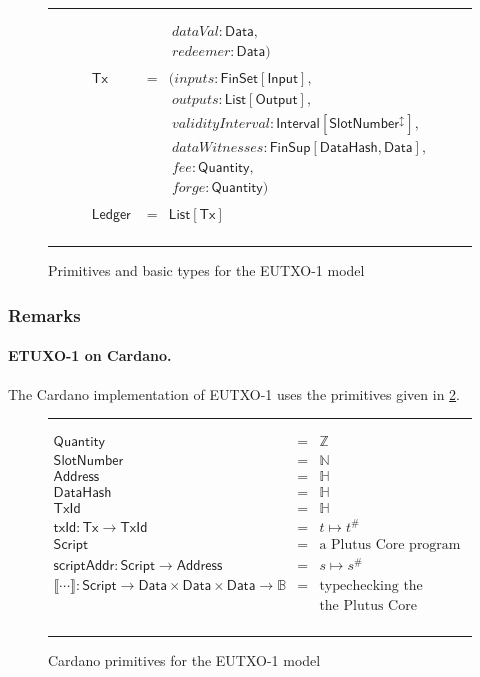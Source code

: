 \documentclass[a4paper]{article}
\renewcommand{\i}{\textit}  %
\newcommand{\s}{\textsf}  %
\newcommand{\msf}[1]{\ensuremath{\mathsf{#1}}}
\newcommand{\mi}[1]{\ensuremath{\mathit{#1}}}
\newcommand\rfskip{7pt}
\newenvironment{ruledfigure}[1]{\begin{figure}[#1]\hrule\vspace{\rfskip}}{\vspace{\rfskip}\hrule\end{figure}}
\newcommand{\hash}[1]{\ensuremath{#1^{\#}}}
\newcommand{\List}[1]{\ensuremath{\s{List}[#1]}}
\newcommand{\FinSet}[1]{\ensuremath{\s{FinSet}[#1]}}
\newcommand{\Interval}[1]{\ensuremath{\s{Interval}[#1]}}
\newcommand{\extended}[1]{#1^\updownarrow}
\newcommand{\FinSup}[2]{\ensuremath{\s{FinSup}[#1,#2]}}
\newcommand{\script}{\ensuremath{\s{Script}}}
\newcommand{\scriptAddr}{\msf{scriptAddr}}
\newcommand{\TxId}{\ensuremath{\s{TxId}}}
\newcommand{\txId}{\msf{txId}}
\newcommand{\Address}{\ensuremath{\s{Address}}}
\newcommand{\DataHash}{\ensuremath{\s{DataHash}}}
\newcommand{\inputs}{\mi{inputs}}
\newcommand{\outputs}{\mi{outputs}}
\newcommand{\forge}{\mi{forge}}
\newcommand{\fee}{\mi{fee}}
\newcommand{\redeemer}{\mi{redeemer}}
\newcommand{\dataVal}{\mi{dataVal}}
\newcommand{\dataWits}{\mi{dataWitnesses}}
\newcommand{\Data}{\ensuremath{\s{Data}}}
\newcommand{\slotnum}{\ensuremath{\s{SlotNumber}}}
\newcommand{\eutxotx}{\msf{Tx}}
\newcommand{\qty}{\ensuremath{\s{Quantity}}}
\newcommand\B{\ensuremath{\mathbb{B}}}
\newcommand\N{\ensuremath{\mathbb{N}}}
\newcommand\Z{\ensuremath{\mathbb{Z}}}
\renewcommand\H{\ensuremath{\mathbb{H}}}
\begin{document}
\begin{ruledfigure}{H}
\begin{displaymath}
\begin{array}{rll}
               & &\ \dataVal: \Data,\\
               & &\ \redeemer: \Data)\\
     \\
     \eutxotx\s{ } &=&(\inputs: \FinSet{\s{Input}},\\
                   & &\ \outputs: \List{\s{Output}},\\
                   & &\ \i{validityInterval}: \Interval{\extended{\slotnum}},\\
                   & &\ \dataWits: \FinSup{\DataHash}{\Data},\\
                   & &\ \fee: \qty,\\
                   & &\ \forge: \qty) \\
     \\
     \s{Ledger } &=&\!\List{\eutxotx}\\
  \end{array}
  \end{displaymath}
  \caption{Primitives and basic types for the EUTXO-1 model}
  \label{fig:eutxo-1-types}
\end{ruledfigure}

\subsubsection{Remarks}
\paragraph{ETUXO-1 on Cardano.}
The Cardano implementation of EUTXO-1 uses the primitives given in
\cref{fig:eutxo-1-types-cardano}.

\begin{ruledfigure}{H}
  \begin{displaymath}
  \begin{array}{rll}
    \qty{} &=& \Z\\
    \slotnum &=& \N\\
    \Address &=& \H\\
    \DataHash &=& \H\\
    \TxId &=& \H\\
    \txId : \eutxotx \rightarrow \TxId &=& t \mapsto \hash{t}\\
    \script &=& \mbox{a Plutus Core program}\\
    \scriptAddr : \script \rightarrow \Address &=& s \mapsto \hash{s}\\
    \llbracket \cdots \rrbracket : \script \rightarrow \Data \times \Data \times
    \Data \rightarrow \B &=& \mbox{typechecking the program and running}\\
                             &&\mbox{the Plutus Core interpreter}\\
  \end{array}
  \end{displaymath}
  \caption{Cardano primitives for the EUTXO-1 model}
  \label{fig:eutxo-1-types-cardano}
\end{ruledfigure}
\end{document}

